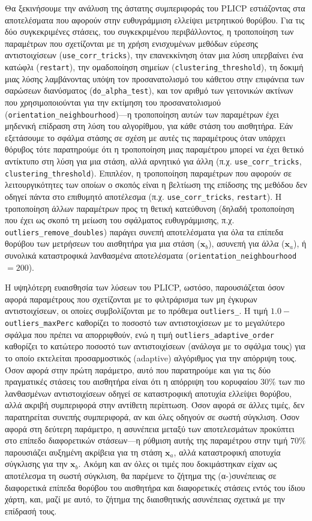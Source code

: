 Θα ξεκινήσουμε την ανάλυση της άστατης συμπεριφοράς του PLICP εστιάζοντας στα
αποτελέσματα που αφορούν στην ευθυγράμμιση ελλείψει μετρητικού θορύβου. Για τις
δύο συγκεκριμένες στάσεις, του συγκεκριμένου περιβάλλοντος, η τροποποίηση των
παραμέτρων που σχετίζονται με τη χρήση ενισχυμένων μεθόδων εύρεσης
αντιστοιχίσεων (\texttt{use\_corr\_tricks}), την επανεκκίνηση όταν μια λύση
υπερβαίνει ένα κατώφλι (\texttt{restart}), την ομαδοποίηση σημείων
(\texttt{clustering\_threshold}), τη δοκιμή μιας λύσης λαμβάνοντας υπόψη τον
προσανατολισμό του κάθετου στην επιφάνεια των σαρώσεων διανύσματος
(\texttt{do\_alpha\_test}), και τον αριθμό των γειτονικών ακτίνων που
χρησιμοποιούνται για την εκτίμηση του προσανατολισμού
(\texttt{orientation\_neighbourhood})---η τροποποίηση αυτών των παραμέτρων
έχει μηδενική επίδραση στη λύση του αλγορίθμου, για κάθε στάση του
αισθητήρα. Εάν εξετάσουμε το σφάλμα στάσης σε σχέση με αυτές τις παραμέτρους
όταν υπάρχει θόρυβος τότε παρατηρούμε ότι η τροποποίηση μιας παραμέτρου μπορεί
να έχει θετικό αντίκτυπο στη λύση για μια στάση, αλλά αρνητικό για άλλη
(π.χ. \texttt{use\_corr\_tricks}, \texttt{clustering\_threshold}). Επιπλέον, η
τροποποίηση παραμέτρων που αφορούν σε λειτουργικότητες των οποίων ο σκοπός
είναι η βελτίωση της επίδοσης της μεθόδου δεν οδηγεί πάντα στο επιθυμητό
αποτέλεσμα (π.χ. \texttt{use\_corr\_tricks}, \texttt{restart}). Η τροποποίηση
άλλων παραμέτρων προς τη θετική κατεύθυνση (δηλαδή τροποποίηση που έχει ως
σκοπό τη μείωση του σφάλματος ευθυγράμμισης, π.χ.
\texttt{outliers\_remove\_doubles}) παράγει συνεπή αποτελέσματα για όλα τα
επίπεδα θορύβου των μετρήσεων του αισθητήρα για μια στάση ($\bm{x}_b$), ασυνεπή
για άλλα ($\bm{x}_a$), ή συνολικά καταστροφικά λανθασμένα αποτελέσματα
(\texttt{orientation\_neighbourhood} $=200$).

Η υψηλότερη ευαισθησία των λύσεων του PLICP, ωστόσο, παρουσιάζεται όσον αφορά
παραμέτρους που σχετίζονται με το φιλτράρισμα των μη έγκυρων αντιστοιχίσεων, οι
οποίες συμβολίζονται με το πρόθεμα \texttt{outliers\_}. Η τιμή
$1.0-$\texttt{outliers\_maxPerc} καθορίζει το ποσοστό των αντιστοιχίσεων με το
μεγαλύτερο σφάλμα που πρέπει να απορριφθούν, ενώ η τιμή
\texttt{outliers\_adaptive\_order} καθορίζει το κατώτερο ποσοστό των
αντιστοιχίσεων (ανάλογα με το σφάλμα τους) για το οποίο εκτελείται
προσαρμοστικός (adaptive) αλγόριθμος για την απόρριψη τους. Όσον αφορά στην
πρώτη παράμετρο, αυτό που παρατηρούμε και για τις δύο πραγματικές στάσεις του
αισθητήρα είναι ότι η απόρριψη του κορυφαίου $30\%$ των πιο λανθασμένων
αντιστοιχίσεων οδηγεί σε καταστροφική αποτυχία ελλείψει θορύβου, αλλά ακριβή
συμπεριφορά στην αντίθετη περίπτωση. Όσον αφορά σε άλλες τιμές, δεν
παρατηρείται συνεπής συμπεριφορά, αν και όλες οδηγούν σε σωστή σύγκλιση. Όσον
αφορά στη δεύτερη παράμετρο, η ασυνέπεια μεταξύ των αποτελεσμάτων προκύπτει στο
επίπεδο διαφορετικών στάσεων---η ρύθμιση αυτής της παραμέτρου στην τιμή $70\%$
παρουσιάζει αυξημένη ακρίβεια για τη στάση $\bm{x}_a$, αλλά καταστροφική
αποτυχία σύγκλισης για την $\bm{x}_b$. Ακόμη και αν όλες οι τιμές που
δοκιμάστηκαν είχαν ως αποτέλεσμα τη σωστή σύγκλιση, θα παρέμενε το ζήτημα της
(α-)συνέπειας σε διαφορετικά επίπεδα θορύβου του αισθητήρα και διαφορετικές
στάσεις εντός του ίδιου χάρτη, και, μαζί με αυτό, το ζήτημα της διαισθητικής
ασυνέπειας σχετικά με την επίδρασή τους.

